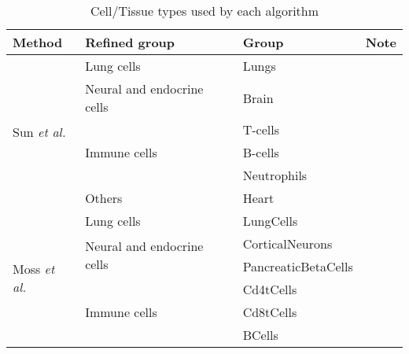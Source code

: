 \documentclass[12pt,letterpaper]{article}
\begin{document}
\begin{table}[htbp]
    \begin{center}
        \caption{Cell/Tissue types used by each algorithm }
        \begin{tabular}{|l|l|l|l|}
            \hline
            \textbf{Method}                         & \textbf{Refined group}                      & \textbf{Group}           & \textbf{Note} \\
            \hline
            \multirow{6}{*}{Sun \textit{et al.}}    & Lung cells                                  & Lungs                    &               \\
            \cline{2-4}                             & Neural and endocrine cells                  & Brain                    &               \\
            \cline{2-4}                             & \multirow{3}{*}{Immune cells}               & T-cells                  &               \\
            \cline{3-4}                             &                                             & B-cells                  &               \\
            \cline{3-4}                             &                                             & Neutrophils              &               \\
            \cline{2-4}                             & Others                                      & Heart                    &               \\
            \hline
            \multirow{6}{*}{Moss \textit{et al.}}   & Lung cells                                  & LungCells                &               \\
            \cline{2-4}                             & \multirow{2}{*}{Neural and endocrine cells} & CorticalNeurons          &               \\
            \cline{3-4}                             &                                             & PancreaticBetaCells      &               \\
            \cline{2-4}                             & \multirow{6}{*}{Immune cells}               & Cd4tCells                &               \\
            \cline{3-4}                             &                                             & Cd8tCells                &               \\
            \cline{3-4}                             &                                             & BCells                   &               \\

\end{tabular}
\end{center}
\end{table}
\end{document}
